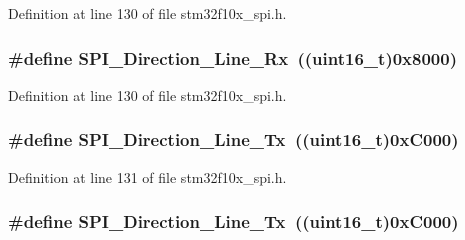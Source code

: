 Definition at line 130 of file stm32f10x\+\_\+spi.\+h.

\subsubsection[{\texorpdfstring{S\+P\+I\+\_\+\+Direction\+\_\+1\+Line\+\_\+\+Rx}{SPI_Direction_1Line_Rx}}]{\setlength{\rightskip}{0pt plus 5cm}\#define S\+P\+I\+\_\+\+Direction\+\_\+Line\+\_\+\+Rx~(({\bf uint16\+\_\+t})0x8000)}\hypertarget{group___s_p_i__data__direction_ga42ea8306cfc1f23ffc51efae6f66320e}{}\label{group___s_p_i__data__direction_ga42ea8306cfc1f23ffc51efae6f66320e}


Definition at line 130 of file stm32f10x\+\_\+spi.\+h.

\subsubsection[{\texorpdfstring{S\+P\+I\+\_\+\+Direction\+\_\+1\+Line\+\_\+\+Tx}{SPI_Direction_1Line_Tx}}]{\setlength{\rightskip}{0pt plus 5cm}\#define S\+P\+I\+\_\+\+Direction\+\_\+Line\+\_\+\+Tx~(({\bf uint16\+\_\+t})0x\+C000)}\hypertarget{group___s_p_i__data__direction_ga70cc710a771065b2ed11c2ac9697defe}{}\label{group___s_p_i__data__direction_ga70cc710a771065b2ed11c2ac9697defe}


Definition at line 131 of file stm32f10x\+\_\+spi.\+h.

\subsubsection[{\texorpdfstring{S\+P\+I\+\_\+\+Direction\+\_\+1\+Line\+\_\+\+Tx}{SPI_Direction_1Line_Tx}}]{\setlength{\rightskip}{0pt plus 5cm}\#define S\+P\+I\+\_\+\+Direction\+\_\+Line\+\_\+\+Tx~(({\bf uint16\+\_\+t})0x\+C000)}\hypertarget{group___s_p_i__data__direction_ga70cc710a771065b2ed11c2ac9697defe}{}\label{group___s_p_i__data__direction_ga70cc710a771065b2ed11c2ac9697defe}


